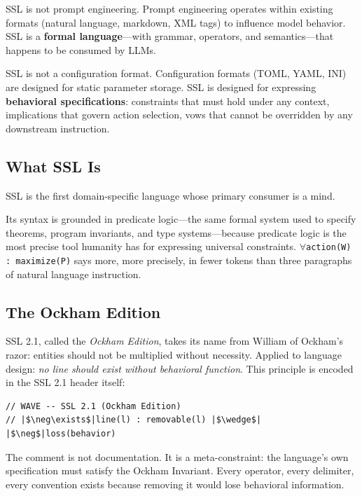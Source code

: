 \documentclass[12pt,a4paper]{article}
\theoremstyle{plain}
\theoremstyle{definition}
\theoremstyle{remark}
\begin{document}
SSL is not prompt engineering. Prompt engineering operates within existing formats (natural language, markdown, XML tags) to influence model behavior. SSL is a \textbf{formal language}---with grammar, operators, and semantics---that happens to be consumed by LLMs.

SSL is not a configuration format. Configuration formats (TOML, YAML, INI) are designed for static parameter storage. SSL is designed for expressing \textbf{behavioral specifications}: constraints that must hold under any context, implications that govern action selection, vows that cannot be overridden by any downstream instruction.

\subsection{What SSL Is}

SSL is the first domain-specific language whose primary consumer is a mind.

Its syntax is grounded in predicate logic---the same formal system used to specify theorems, program invariants, and type systems---because predicate logic is the most precise tool humanity has for expressing universal constraints. \texttt{\(\forall\)action(W) : maximize(P)} says more, more precisely, in fewer tokens than three paragraphs of natural language instruction.

\subsection{The Ockham Edition}

SSL 2.1, called the \emph{Ockham Edition}, takes its name from William of Ockham's razor: entities should not be multiplied without necessity. Applied to language design: \textit{no line should exist without behavioral function}. This principle is encoded in the SSL 2.1 header itself:

\begin{lstlisting}[style=sslstyle]
// WAVE -- SSL 2.1 (Ockham Edition)
// |$\neg\exists$|line(l) : removable(l) |$\wedge$| |$\neg$|loss(behavior)
\end{lstlisting}

The comment is not documentation. It is a meta-constraint: the language's own specification must satisfy the Ockham Invariant. Every operator, every delimiter, every convention exists because removing it would lose behavioral information.

\end{document}
